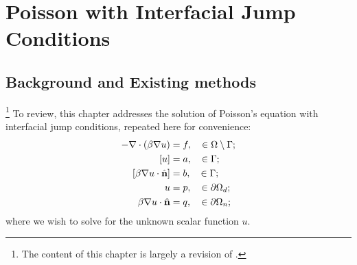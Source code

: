 %

\chapter{Poisson with Interfacial Jump Conditions} \label{chap:partII.poisson}

\section{Background and Existing methods} \label{sec:chap4.background}

\footnote{The content of this chapter is largely a revision of \cite{Hellrung12}.}
To review, this chapter addresses the solution of Poisson's equation with interfacial jump conditions, repeated here for convenience:
\begin{subequations} \label{eq:chap4.poisson}
\begin{align}
-\nabla \cdot \left( \beta \nabla u \right) & = f, \quad \in \Omega \setminus \Gamma; \label{eq:chap4.poisson.PDE} \\
\left[ u \right] & = a, \quad \in \Gamma; \label{eq:chap4.poisson.DJ} \\
\left[ \beta \nabla u \cdot \hat{\mathbf{n}} \right] & = b, \quad \in \Gamma; \label{eq:chap4.poisson.NJ} \\
u & = p, \quad \in \partial\Omega_d; \label{eq:chap4.poisson.D} \\
\beta \nabla u \cdot \hat{\mathbf{n}} & = q, \quad \in \partial\Omega_n; \label{eq:chap4.poisson.N}
\end{align}
\end{subequations}
where we wish to solve for the unknown scalar function $u$.

